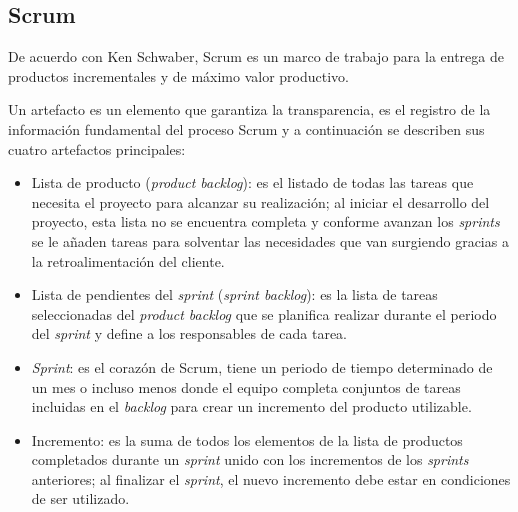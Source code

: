 \subsection{Scrum}

De acuerdo con Ken Schwaber\cite{the_scrum_guide_definitive_2020}, Scrum es un marco de trabajo para la entrega de productos incrementales y de máximo valor productivo.

Un artefacto es un elemento que garantiza la transparencia, es el registro de la información fundamental del proceso Scrum y a continuación se describen sus cuatro artefactos principales:

\begin{itemize}
	\item Lista de producto (\textit{product backlog}):	es el listado de todas las tareas que necesita el proyecto para alcanzar su realización; al iniciar el desarrollo del proyecto, esta lista no se encuentra completa y conforme avanzan los \textit{sprints} se le añaden tareas para solventar las necesidades que van surgiendo gracias a la retroalimentación del cliente.
	\item Lista de pendientes del \textit{sprint} (\textit{sprint backlog}): es la lista de tareas seleccionadas del \textit{product backlog} que se planifica realizar durante el periodo del \textit{sprint} y define a los responsables de cada tarea.
	\item \textit{Sprint}: es el corazón de Scrum, tiene un periodo de tiempo determinado de un mes o incluso menos donde el equipo completa conjuntos de tareas incluidas en el \textit{backlog} para crear un incremento del producto utilizable.
	\item Incremento: es la suma de todos los elementos de la lista de productos completados durante un \textit{sprint} unido con los incrementos de los \textit{sprints} anteriores; al finalizar el \textit{sprint}, el nuevo incremento debe estar en condiciones de ser utilizado.
\end{itemize}

